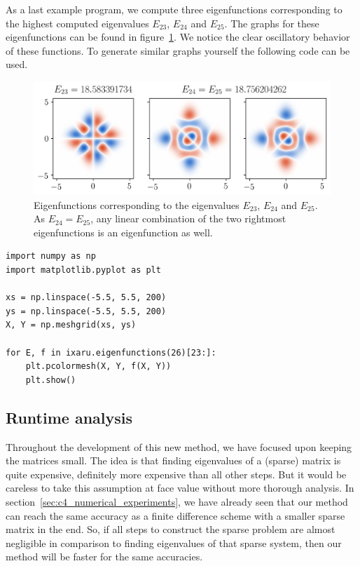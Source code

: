 As a last example program, we compute three eigenfunctions corresponding to the highest computed eigenvalues $E_{23}$, $E_{24}$ and $E_{25}$. The graphs for these eigenfunctions can be found in figure~\ref{fig:c4_nm_ixaru_eigenfunctions}. We notice the clear oscillatory behavior of these functions. To generate similar graphs yourself the following code can be used.

\begin{figure}
    \begin{center}
        \includegraphics[width=\textwidth]{img/chapter4/nm_ixaru_eigenfunctions.png}
    \end{center}
    \caption{Eigenfunctions corresponding to the eigenvalues $E_{23}$, $E_{24}$ and $E_{25}$. As $E_{24} = E_{25}$, any linear combination of the two rightmost eigenfunctions is an eigenfunction as well.}
    \label{fig:c4_nm_ixaru_eigenfunctions}
\end{figure}

\begin{verbatim}
import numpy as np
import matplotlib.pyplot as plt

xs = np.linspace(-5.5, 5.5, 200)
ys = np.linspace(-5.5, 5.5, 200)
X, Y = np.meshgrid(xs, ys)

for E, f in ixaru.eigenfunctions(26)[23:]:
    plt.pcolormesh(X, Y, f(X, Y))
    plt.show()
\end{verbatim}


\subsection{Runtime analysis}\label{sec:c4_nm_runtime}

Throughout the development of this new method, we have focused upon keeping the matrices small. The idea is that finding eigenvalues of a (sparse) matrix is quite expensive, definitely more expensive than all other steps. But it would be careless to take this assumption at face value without more thorough analysis. In section~\ref{sec:c4_numerical_experiments}, we have already seen that our method can reach the same accuracy as a finite difference scheme with a smaller sparse matrix in the end. So, if all steps to construct the sparse problem are almost negligible in comparison to finding eigenvalues of that sparse system, then our method will be faster for the same accuracies.

